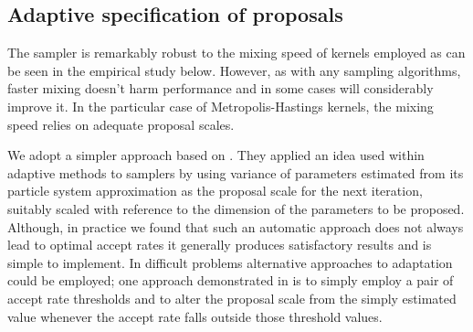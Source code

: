 

\subsection{Adaptive specification of proposals}
\label{sub:Adaptive specification of proposals}

The \smc sampler is remarkably robust to the mixing speed of \mcmc kernels
employed as can be seen in the empirical study below. However, as with any
sampling algorithms, faster mixing doesn't harm performance and in some cases
will considerably improve it. In the particular case of Metropolis-Hastings
kernels, the mixing speed relies on adequate proposal scales.

We adopt a simpler approach based on \cite{Jasra:2010eh}. They applied an idea
used within adaptive \mcmc methods \cite{Andrieu:2006tw} to \smc samplers by
using variance of parameters estimated from its particle system approximation
as the proposal scale for the next iteration, suitably scaled with reference
to the dimension of the parameters to be proposed. Although, in practice we
found that such an automatic approach does not always lead to optimal accept
rates it generally produces satisfactory results and is simple to implement.
In difficult problems alternative approaches to adaptation could be employed;
one approach demonstrated in \cite{Jasra:2010eh} is to simply employ a pair of
accept rate  thresholds and to alter the proposal scale from the simply
estimated value whenever the accept rate falls outside those threshold values.

